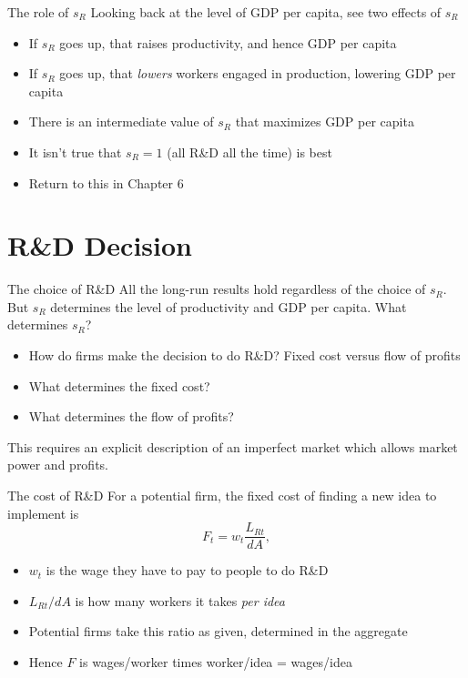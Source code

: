 \begin{frame}{The role of $s_R$}
Looking back at the level of GDP per capita, see two effects of $s_R$
\begin{itemize}
	\item If $s_R$ goes up, that raises productivity, and hence GDP per capita
	\item If $s_R$ goes up, that \textit{lowers} workers engaged in production, lowering GDP per capita
	\item There is an intermediate value of $s_R$ that maximizes GDP per capita
	\item It isn't true that $s_R = 1$ (all R\&D all the time) is best
	\item Return to this in Chapter 6
\end{itemize}
\end{frame}

\section{R\&D Decision}
\begin{frame}{The choice of R\&D}
All the long-run results hold regardless of the choice of $s_R$. But $s_R$ determines the level of productivity and GDP per capita. What determines $s_R$?
\begin{itemize}
	\item How do firms make the decision to do R\&D? Fixed cost versus flow of profits
	\item What determines the fixed cost? 
	\item What determines the flow of profits?
\end{itemize}
This requires an explicit description of an imperfect market which allows market power and profits. 
\end{frame}

\begin{frame}{The cost of R\&D}
For a potential firm, the fixed cost of finding a new idea to implement is
\begin{equation}
	F_t = w_t \frac{L_{Rt}}{dA},
\end{equation}
\begin{itemize}
	\item $w_t$ is the wage they have to pay to people to do R\&D
	\item $L_{Rt}/dA$ is how many workers it takes \textit{per idea}
	\item Potential firms take this ratio as given, determined in the aggregate
	\item Hence $F$ is wages/worker times worker/idea = wages/idea
\end{itemize}
\end{frame}

